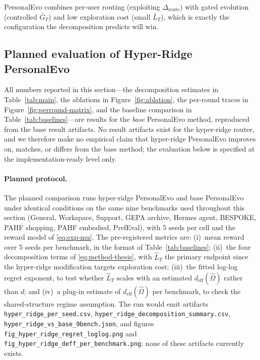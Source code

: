 \documentclass{article} %
\begin{document}
PersonalEvo combines per-user routing (exploiting $\Delta_{\mathrm{route}}$) with gated evolution (controlled $\bar G_T$) and low exploration cost (small $\bar L_T$), which is exactly the configuration the decomposition predicts will win.

\subsection{Planned evaluation of Hyper-Ridge PersonalEvo}
\label{sec:exp-hyper-ridge-plan}

All numbers reported in this section---the decomposition estimates in Table~\ref{tab:main}, the ablations in Figure~\ref{fig:ablation}, the per-round traces in Figure~\ref{fig:perround-matrix}, and the baseline comparison in Table~\ref{tab:baselines}---are results for the \emph{base} PersonalEvo method, reproduced from the base result artifacts. No result artifacts exist for the hyper-ridge router, and we therefore make no empirical claim that hyper-ridge PersonalEvo improves on, matches, or differs from the base method; the evaluation below is specified at the implementation-ready level only.

\paragraph{Planned protocol.} The planned comparison runs hyper-ridge PersonalEvo and base PersonalEvo under identical conditions on the same nine benchmarks used throughout this section (General, Workspace, Support, GEPA archive, Hermes agent, BESPOKE, PAHF shopping, PAHF embodied, PrefEval), with 5 seeds per cell and the reward model of \eqref{eq:exp-mu}. The pre-registered metrics are: (i)~mean reward over 5 seeds per benchmark, in the format of Table~\ref{tab:baselines}; (ii)~the four decomposition terms of \eqref{eq:method-thesis}, with $\widehat L_T$ the primary endpoint since the hyper-ridge modification targets exploration cost; (iii)~the fitted log-log regret exponent, to test whether $\widehat L_T$ scales with an estimated $d_{\mathrm{eff}}(\widehat\Omega)$ rather than $d$; and (iv)~a plug-in estimate of $d_{\mathrm{eff}}(\widehat\Omega)$ per benchmark, to check the shared-structure regime assumption. The run would emit artifacts \texttt{hyper\_ridge\_per\_seed.csv}, \texttt{hyper\_ridge\_decomposition\_summary.csv}, \texttt{hyper\_ridge\_vs\_base\_9bench.json}, and figures \texttt{fig\_hyper\_ridge\_regret\_loglog.png} and \texttt{fig\_hyper\_ridge\_deff\_per\_benchmark.png}; none of these artifacts currently exists.
\end{document}
